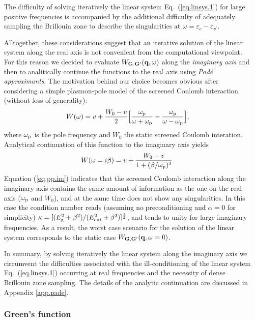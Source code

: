 \documentclass[twocolumn,prb,showpacs,superscriptaddress]{revtex4}
\def\w{\omega}
\def\E{\varepsilon}
\def\vp{{v^\prime}}
\def\q{{\bf q}}
\def\G{{\bf G}}
\def\Gp{{\bf G^\prime}}
\begin{document}
The difficulty of solving iteratively the linear system Eq.\ (\ref{eq.linsys.1})
for large positive frequencies is accompanied by the additional difficulty 
of adequately sampling the Brillouin zone to describe the singularities at $\w = \E_c - \E_\vp$.

Alltogether, these considerations suggest that an iterative solution of the
linear system along the real axis is not convenient from the computational
viewpoint. For this reason we decided to evaluate $W_{\G,\Gp}(\q,\w)$
along the {\it imaginary axis} and then to analitically continue the functions
to the real axis using {\it Pad\'e approximants}.\cite{pade1,pade2,blochl}
The motivation behind our choice becomes obvious after considering a simple
plasmon-pole model of the screened Coulomb interaction (without loss of
generality):\cite{hl86}
  \begin{equation}
  W(\w) = v + \frac{W_0 -v}{2} \Big[ \frac{\w_{\rm p}}{\w+\w_{\rm p}} - \frac{\w_{\rm p}}{\w-\w_{\rm p}} \Big],
  \end{equation}
where $\w_{\rm p}$ is the pole frequency and $W_0$ the static screened Coulomb interation.
Analytical continuation of this function to the imaginary axis yields
  \begin{equation} \label{eq.pp.im}
  W(\w=i\beta) = v + \frac{W_0 -v}{1+(\beta/\w_{\rm p})^2}.
  \end{equation}
Equation (\ref{eq.pp.im}) indicates that the screened Coulomb interaction along the imaginary axis contains the same
amount of information as the one on the real axis ($\w_{\rm p}$ and $W_0$), and at the same time
does not show any singularities. In this case the condition number reads
(assuming no preconditioning and $\alpha=0$ for simplicity) 
$\kappa=[(E_{\rm g}^2+\beta^2)/(E_{\rm cut}^2+\beta^2)]^\frac{1}{2}$,
and tends to unity for large imaginary frequencies.
As a result, the worst case scenario for the solution 
of the linear system corresponds to the static case $W_{\G,\Gp}(\q,\w=0)$.

In summary, by solving iteratively the linear system along the imaginary
axis we circumvent the difficulties associated with the ill-conditioning
of the linear system Eq.\ (\ref{eq.linsys.1}) occurring at real frequencies
and the necessity of dense Brillouin zone sampling.
The details of the analytic continuation are discussed in Appendix \ref{app.pade}.

\subsubsection{Green's function}
\end{document}
